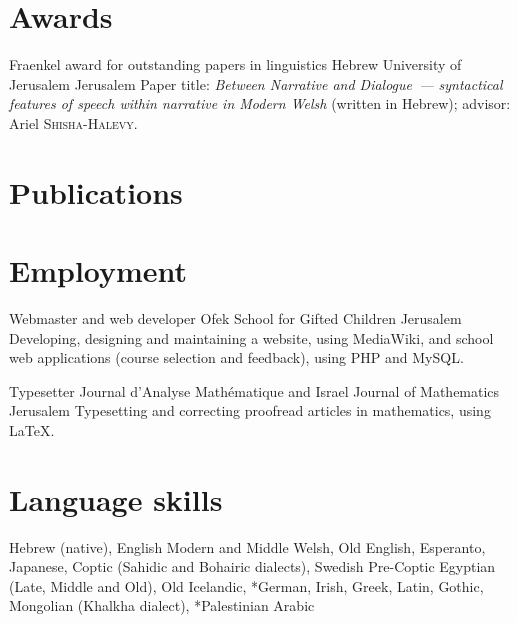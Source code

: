 


\section{Awards}

	{Fraenkel award for outstanding papers in linguistics} %
	{Hebrew University of Jerusalem}
	{Jerusalem}
	{}
	{Paper title: \emph{Between Narrative and Dialogue~— syntactical features of speech within narrative in Modern Welsh} (written in Hebrew); advisor: Ariel \textsc{Shisha-Halevy}.}



\section{Publications}

\nocite{*}
\printbibliography[keyword=edit-text, heading=subbibliography, title={Editing, collecting, digitising and typesetting texts}]
\printbibliography[keyword=edit-music, heading=subbibliography, title={Editing, collecting, digitising and engraving music}]
\printbibliography[keyword=language-instruction, heading=subbibliography, title={Language instruction}]



\section{Employment}

	{Webmaster and web developer}
	{Ofek School for Gifted Children}
	{Jerusalem}
	{}
	{Developing, designing and maintaining a website, using MediaWiki, and school web applications (course selection and feedback), using PHP and MySQL.}

	{Typesetter}
	{Journal d’Analyse Mathématique and Israel Journal of Mathematics}
	{Jerusalem}
	{}
	{Typesetting and correcting proofread articles in mathematics, using \LaTeX .}



\section{Language skills}

	{Hebrew (native), English}
	{Modern and Middle Welsh, Old English, Esperanto, Japanese, Coptic (Sahidic and Bohairic dialects), Swedish}
	{Pre-Coptic Egyptian (Late, Middle and Old), Old Icelandic, *German, Irish, Greek, Latin, Gothic, Mongolian (Khalkha dialect), *Palestinian Arabic}



